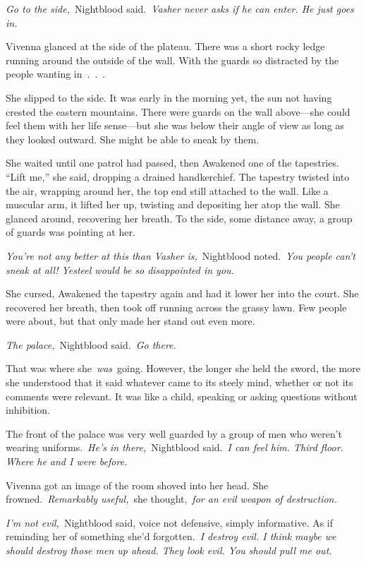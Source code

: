 \textit{Go to the side,}~Nightblood said.~\textit{Vasher never asks if he can enter. He just goes in.}

Vivenna glanced at the side of the plateau. There was a short rocky ledge running around the outside of the wall. With the guards so distracted by the people wanting in~.~.~.

She slipped to the side. It was early in the morning yet, the sun not having crested the eastern mountains. There were guards on the wall above—she could feel them with her life sense—but she was below their angle of view as long as they looked outward. She might be able to sneak by them.

She waited until one patrol had passed, then Awakened one of the tapestries. “Lift me,” she said, dropping a drained handkerchief. The tapestry twisted into the air, wrapping around her, the top end still attached to the wall. Like a muscular arm, it lifted her up, twisting and depositing her atop the wall. She glanced around, recovering her breath. To the side, some distance away, a group of guards was pointing at her.

\textit{You’re not any better at this than Vasher is,}~Nightblood noted.~\textit{You people can’t sneak at all! Yesteel would be so disappointed in you.}

She cursed, Awakened the tapestry again and had it lower her into the court. She recovered her breath, then took off running across the grassy lawn. Few people were about, but that only made her stand out even more.

\textit{The palace,}~Nightblood said.~\textit{Go there.}

That was where she~\textit{was}~going. However, the longer she held the sword, the more she understood that it said whatever came to its steely mind, whether or not its comments were relevant. It was like a child, speaking or asking questions without inhibition.

The front of the palace was very well guarded by a group of men who weren’t wearing uniforms.~\textit{He’s in there,}~Nightblood said.~\textit{I can feel him. Third floor. Where he and I were before.}

Vivenna got an image of the room shoved into her head. She frowned.~\textit{Remarkably useful,}~she thought,~\textit{for an evil weapon of destruction.}

\textit{I’m not evil,}~Nightblood said, voice not defensive, simply informative. As if reminding her of something she’d forgotten.~\textit{I destroy evil. I think maybe we should destroy those men up ahead. They look evil. You should pull me out.}

